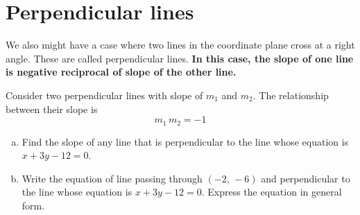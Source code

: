 \section{Perpendicular lines}
We also might have a case where two lines in the coordinate plane cross at a right angle. These are called perpendicular lines. \textbf{In this case, the slope of one line is negative reciprocal of slope of the other line.}
\begin{tcolorbox}[
                        title=Perpendicular lines,
                        fonttitle=\bfseries,
                        colframe=blue!70!red,
                        colback=white
                        ]
	Consider two perpendicular lines with slope of $m_1$ and $m_2$. The relationship between their slope is
    	\begin{equation}
    		m_1\,m_2=-1 \label{perpendicular}
    	\end{equation}
    \begin{center}
    \end{center}
\end{tcolorbox}
\begin{exa} \leavevmode 
    \begin{enumerate}[a., font=\bfseries]
        \item Find the slope of any line that is perpendicular to the line whose equation is $x+3y-12=0$.
        \item Write the equation of line passing through $(-2,\,-6)$ and perpendicular to the line whose equation is $x+3y-12=0$. Express the equation in general form.
    \end{enumerate}
\end{exa}

